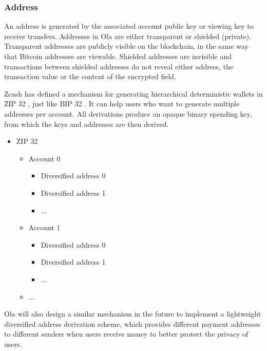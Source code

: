 \subsubsection{Address}\label{section: address}

An address is generated by the associated account public key or viewing key to receive transfers. Addresses in Ola are either transparent or shielded (private). Transparent addresses are publicly visible on the blockchain, in the same way that Bitcoin addresses are viewable. Shielded addresses are invisible and transactions between shielded addresses do not reveal either address, the transaction value or the content of the encrypted field.

Zcash has defined a mechanism for generating hierarchical deterministic wallets in ZIP 32 \cite{website:ZIP-32}, just like BIP 32 \cite{website:BIP-32}. It can help users who want to generate multiple addresses per account. All derivations produce an opaque binary spending key, from which the keys and addresses are then derived.

\begin{itemize}
    \item ZIP 32
        \begin{itemize}
            \item Account 0
                \begin{itemize}
                    \item Diversified address 0
                    \item Diversified address 1
                    \item ...
                \end{itemize}
            \item Account 1
                \begin{itemize}
                    \item Diversified address 0
                    \item Diversified address 1
                    \item ...
                \end{itemize}
            \item ...
        \end{itemize}
\end{itemize}

Ola will also design a similar mechanism in the future to implement a lightweight diversified address derivation scheme, which provides different payment addresses to different senders when users receive money to better protect the privacy of users.